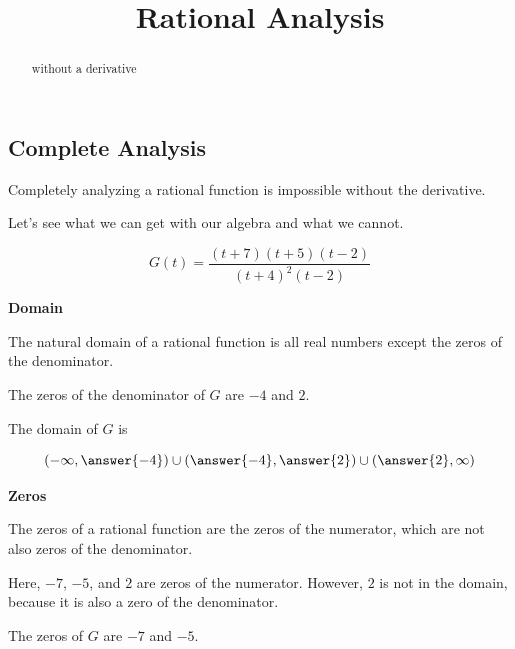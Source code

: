\documentclass{ximera}
\title{Rational Analysis}
\begin{document}
\begin{abstract}
without a derivative
\end{abstract}
\maketitle





\subsection*{Complete Analysis}


Completely analyzing a rational function is impossible without the derivative. 


Let's see what we can get with our algebra and what we cannot.




\[
G(t) = \frac{(t+7)(t+5)(t-2)}{(t+4)^2(t-2)}
\]



\textbf{\textcolor{purple!85!blue}{Domain}} 

\begin{explanation}

The natural domain of a rational function is all real numbers except the zeros of the denominator. 

The zeros of the denominator of $G$ are $-4$ and $2$. 


The domain of $G$ is 

\[
\left( -\infty, \answer{-4} \right) \cup \left(\answer{-4}, \answer{2} \right) \cup \left( \answer{2}, \infty \right)
\]


\end{explanation}









\textbf{\textcolor{purple!85!blue}{Zeros}} 

\begin{explanation}

The zeros of a rational function are the zeros of the numerator, which are not also zeros of the denominator.


Here, $-7$, $-5$, and $2$ are zeros of the numerator.  However, $2$ is not in the domain, because it is also a zero of the denominator.


The zeros of $G$ are $-7$ and $-5$.


\end{explanation}
\end{document}
